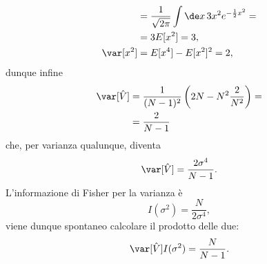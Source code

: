 \begin{solution}
\begin{align*}
		&= \frac1{\sqrt{2\pi}} \int\de x\, 3x^2 e^{-\frac12 x^2} = \\
		&= 3E[x^2] = 3, \\
		\var[x^2]
		&= E[x^4] - E[x^2]^2
		= 2,
	\end{align*}
	dunque infine
	\begin{align*}
		\var[\hat V]
		&= \frac1{(N-1)^2} \left( 2N - N^2 \frac2{N^2} \right) = \\
		&= \frac2{N-1}
	\end{align*}
	che, per varianza qualunque, diventa
	\begin{equation*}
		\var[\hat V]
		= \frac{2\sigma^4}{N-1}.
	\end{equation*}
	L'informazione di Fisher per la varianza è
	\begin{equation*}
		I(\sigma^2)
		= \frac N{2\sigma^4},
	\end{equation*}
	viene dunque spontaneo calcolare il prodotto delle due:
	\begin{equation*}
		\var[\hat V]I(\sigma^2)
		= \frac N{N-1}.
	\end{equation*}
\end{solution}

